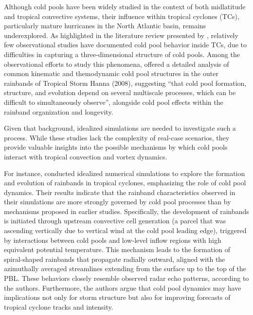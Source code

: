 Although cold pools have been widely studied in the context of both midlatitude and tropical convective systems, their influence within tropical cyclones (TCs), particularly mature hurricanes in the North Atlantic basin, remains underexplored. As highlighted in the literature review presented by , relatively few observational studies have documented cold pool behavior inside TCs, due to difficulties in capturing a three-dimensional structure of cold pools. Among the observational efforts to study this phenomena,  offered a detailed analysis of common kinematic and themodynamic cold pool structures in the outer rainbands of Tropical Storm Hanna (2008), suggesting ``that cold pool formation, structure, and evolution depend on several multiscale processes, which can be difficult to simultaneously observe'', alongside cold pool effects within the rainband organization and longevity.

Given that background, idealized simulations are needed to investigate such a process. While these studies lack the complexity of real-case scenarios, they provide valuable insights into the possible mechanisms by which cold pools interact with tropical convection and vortex dynamics.

For instance,  conducted idealized numerical simulations to explore the formation and evolution of rainbands in tropical cyclones, emphasizing the role of cold pool dynamics. Their results indicate that the rainband characteristics observed in their simulations are more strongly governed by cold pool processes than by mechanisms proposed in earlier studies. Specifically, the development of rainbands is initiated through upstream convective cell generation (a parcel that was ascending vertically due to vertical wind at the cold pool leading edge), triggered by interactions between cold pools and low-level inflow regions with high equivalent potential temperature. This mechanism leads to the formation of spiral-shaped rainbands that propagate radially outward, aligned with the azimuthally averaged streamlines extending from the surface up to the top of the PBL. These behaviors closely resemble observed radar echo patterns, according to the authors. Furthermore, the authors argue that cold pool dynamics may have implications not only for storm structure but also for improving forecasts of tropical cyclone tracks and intensity.

